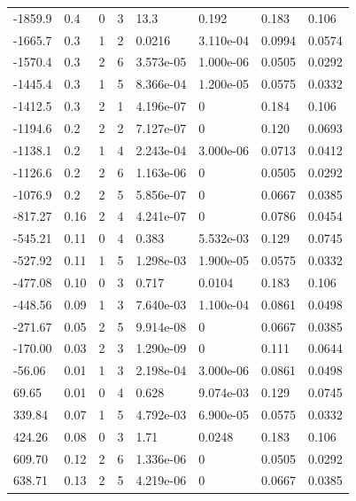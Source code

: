 \documentclass[preview]{standalone}
\begin{document}
{{\begin{tabular}{L{1.2cm}C{1.2cm} C{0.3cm}C{0.5cm} C{1.4cm}C{1.4cm} C{1.4cm}C{1.4cm}}
  -1859.9  &   0.4  & 0     &  3 &  13.3  & 0.192  & 0.183 &  0.106   \\ 
  -1665.7  &   0.3  & 1     &  2 &  0.0216  & 3.110e-04  & 0.0994 &  0.0574   \\ 
  -1570.4  &   0.3  & 2     &  6 &  3.573e-05  & 1.000e-06  & 0.0505 &  0.0292   \\ 
  -1445.4  &   0.3  & 1     &  5 &  8.366e-04  & 1.200e-05  & 0.0575 &  0.0332   \\ 
  -1412.5  &   0.3  & 2     &  1 &  4.196e-07  & 0  & 0.184 &  0.106   \\ 
  -1194.6  &   0.2  & 2     &  2 &  7.127e-07  & 0  & 0.120 &  0.0693   \\ 
  -1138.1  &   0.2  & 1     &  4 &  2.243e-04  & 3.000e-06  & 0.0713 &  0.0412   \\ 
  -1126.6  &   0.2  & 2     &  6 &  1.163e-06  & 0  & 0.0505 &  0.0292   \\ 
  -1076.9  &   0.2  & 2     &  5 &  5.856e-07  & 0  & 0.0667 &  0.0385   \\ 
  -817.27  &  0.16  & 2     &  4 &  4.241e-07  & 0  & 0.0786 &  0.0454   \\ 
  -545.21  &  0.11  & 0     &  4 &  0.383  & 5.532e-03  & 0.129 &  0.0745   \\ 
  -527.92  &  0.11  & 1     &  5 &  1.298e-03  & 1.900e-05  & 0.0575 &  0.0332   \\ 
  -477.08  &  0.10  & 0     &  3 &  0.717  & 0.0104  & 0.183 &  0.106   \\ 
  -448.56  &  0.09  & 1     &  3 &  7.640e-03  & 1.100e-04  & 0.0861 &  0.0498   \\ 
  -271.67  &  0.05  & 2     &  5 &  9.914e-08  & 0  & 0.0667 &  0.0385   \\ 
  -170.00  &  0.03  & 2     &  3 &  1.290e-09  & 0  & 0.111 &  0.0644   \\ 
  -56.06  &  0.01  & 1     &  3 &  2.198e-04  & 3.000e-06  & 0.0861 &  0.0498   \\ 
  69.65  &  0.01  & 0     &  4 &  0.628  & 9.074e-03  & 0.129 &  0.0745   \\ 
  339.84  &  0.07  & 1     &  5 &  4.792e-03  & 6.900e-05  & 0.0575 &  0.0332   \\ 
  424.26  &  0.08  & 0     &  3 &  1.71  & 0.0248  & 0.183 &  0.106   \\ 
  609.70  &  0.12  & 2     &  6 &  1.336e-06  & 0  & 0.0505 &  0.0292   \\ 
  638.71  &  0.13  & 2     &  5 &  4.219e-06  & 0  & 0.0667 &  0.0385   \\ 

\end{tabular}}}
\end{document}
